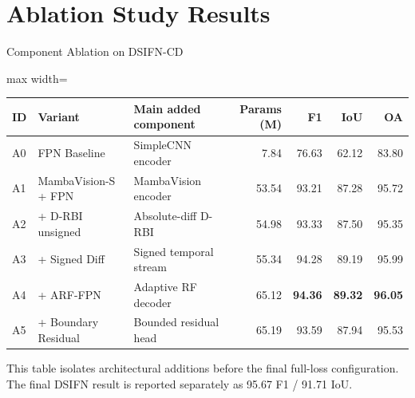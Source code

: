 \section{Ablation Study Results}

\begin{frame}{Component Ablation on DSIFN-CD}
    \centering
    \scriptsize
    \begin{adjustbox}{max width=\textwidth}
    \begin{tabular}{lllrrrr}
        \toprule
        \textbf{ID} & \textbf{Variant} & \textbf{Main added component} & \textbf{Params (M)} & \textbf{F1} & \textbf{IoU} & \textbf{OA} \\
        \midrule
        A0 & FPN Baseline & SimpleCNN encoder & 7.84 & 76.63 & 62.12 & 83.80 \\
        A1 & MambaVision-S + FPN & MambaVision encoder & 53.54 & 93.21 & 87.28 & 95.72 \\
        A2 & + D-RBI unsigned & Absolute-diff D-RBI & 54.98 & 93.33 & 87.50 & 95.35 \\
        A3 & + Signed Diff & Signed temporal stream & 55.34 & 94.28 & 89.19 & 95.99 \\
        A4 & + ARF-FPN & Adaptive RF decoder & 65.12 & \textbf{94.36} & \textbf{89.32} & \textbf{96.05} \\
        A5 & + Boundary Residual & Bounded residual head & 65.19 & 93.59 & 87.94 & 95.53 \\
        \bottomrule
    \end{tabular}
    \end{adjustbox}

    \vspace{0.5em}
    \scriptsize
    This table isolates architectural additions before the final full-loss configuration. The final DSIFN result is reported separately as 95.67 F1 / 91.71 IoU.
\end{frame}

